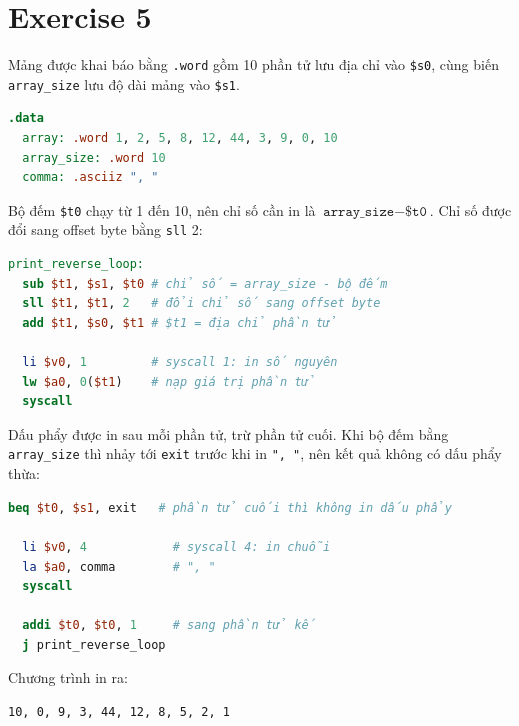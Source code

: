 \section{Exercise 5}

Mảng được khai báo bằng \texttt{.word} gồm 10 phần tử lưu địa chỉ vào \texttt{\$s0}, cùng biến \texttt{array\_size} lưu độ dài mảng vào \texttt{\$s1}.

\begin{lstlisting}[language=MIPS,numbers=none]
.data
  array: .word 1, 2, 5, 8, 12, 44, 3, 9, 0, 10
  array_size: .word 10
  comma: .asciiz ", "
\end{lstlisting}

Bộ đếm \texttt{\$t0} chạy từ 1 đến 10, nên chỉ số cần in là $\texttt{array\_size} - \texttt{\$t0}$. Chỉ số được đổi sang offset byte bằng \texttt{sll} 2:

\begin{lstlisting}[language=MIPS,numbers=none]
print_reverse_loop:
  sub $t1, $s1, $t0 # chỉ số = array_size - bộ đếm
  sll $t1, $t1, 2   # đổi chỉ số sang offset byte
  add $t1, $s0, $t1 # $t1 = địa chỉ phần tử

  li $v0, 1         # syscall 1: in số nguyên
  lw $a0, 0($t1)    # nạp giá trị phần tử
  syscall
\end{lstlisting}

Dấu phẩy được in sau mỗi phần tử, trừ phần tử cuối. Khi bộ đếm bằng \texttt{array\_size} thì nhảy tới \texttt{exit} trước khi in \texttt{", "}, nên kết quả không có dấu phẩy thừa:

\begin{lstlisting}[language=MIPS,numbers=none]
  beq $t0, $s1, exit   # phần tử cuối thì không in dấu phẩy

  li $v0, 4            # syscall 4: in chuỗi
  la $a0, comma        # ", "
  syscall

  addi $t0, $t0, 1     # sang phần tử kế
  j print_reverse_loop
\end{lstlisting}

Chương trình in ra:

\begin{lstlisting}[language={},numbers=none]
10, 0, 9, 3, 44, 12, 8, 5, 2, 1
\end{lstlisting}
